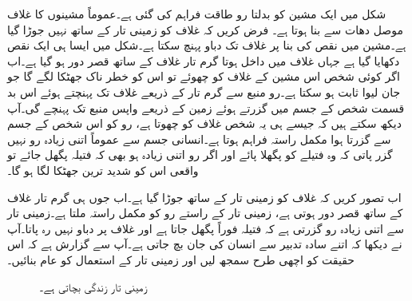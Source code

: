 شکل میں ایک مشین کو بدلتا رو طاقت فراہم کی گئی ہے۔عموماً مشینوں کا غلاف موصل دھات سے بنا ہوتا ہے۔ فرض کریں کہ غلاف کو زمینی تار کے ساتھ نہیں جوڑا گیا ہے۔مشین میں نقص کی بنا پر غلاف تک دباو پہنچ سکتا ہے۔شکل میں ایسا ہی ایک نقص دکھایا گیا ہے جہاں غلاف میں داخل ہوتا گرم تار غلاف کے ساتھ قصر دور ہو گیا ہے۔اب اگر کوئی شخص اس مشین کے غلاف کو چھوئے تو اس کو خطر ناک جھٹکا لگے گا جو جان لیوا ثابت ہو سکتا ہے۔رو منبع سے گرم تار کے ذریعے غلاف تک پہنچتے ہوئے اس بد قسمت شخص کے جسم میں گزرتے ہوئے زمین کے ذریعے واپس منبع تک پہنچے گی۔آپ دیکھ سکتے ہیں کہ جیسے ہی یہ شخص غلاف کو چھوتا ہے، رو کو اس شخص کے جسم سے گزرتا ہوا مکمل راستہ فراہم ہوتا ہے۔انسانی جسم سے عموماً اتنی زیادہ رو نہیں گزر پاتی کہ وہ فتیلے کو پگھلا پائے اور اگر رو اتنی زیادہ ہو بھی کہ فتیلہ پگھل جائے تو واقعی اس کو شدید ترین جھٹکا لگا ہو گا۔

اب تصور کریں کہ غلاف کو زمینی تار کے ساتھ جوڑا گیا ہے۔اب جوں ہی گرم تار غلاف کے ساتھ قصر دور ہوتی ہے، زمینی تار کے راستے رو کو مکمل راستہ ملتا ہے۔زمینی تار  سے اتنی زیادہ رو گزرتی ہے کہ فتیلہ فوراً پگھل جاتا ہے اور غلاف پر دباو نہیں رہ پاتا۔آپ نے دیکھا کہ اتنے سادہ تدبیر سے انسان کی جان بچ جاتی ہے۔آپ سے گزارش ہے کہ اس حقیقت کو اچھی طرح سمجھ لیں اور زمینی تار کے استعمال کو عام بنائیں۔ 

\begin{figure}
\centering
{}
\caption{زمینی تار زندگی بچاتی ہے۔}
\label{شکل_طاقت_زمینی_تار_حفاظتی_اقدام}
\end{figure}

